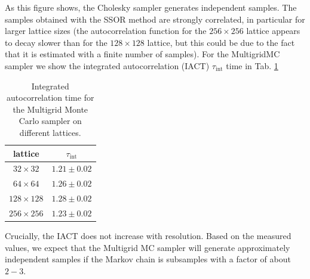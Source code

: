 \documentclass[11pt]{article}
\begin{document}
As this figure shows, the Cholesky sampler generates independent samples. The samples obtained with the SSOR method are strongly correlated, in particular for larger lattice sizes (the autocorrelation function for the $256\times 256$ lattice appears to decay slower than for the $128\times 128$ lattice, but this could be due to the fact that it is estimated with a finite number of samples). For the MultigridMC sampler we show the integrated autocorrelation (IACT) $\tau_{\text{int}}$ time in Tab. \ref{tab:tau_int}
\begin{table}
    \begin{center}
        \begin{tabular}{cc}
            \hline
            lattice         & $\tau_{\text{int}}$ \\
            \hline\hline
            $32 \times 32$  & $1.21 \pm  0.02$    \\
            $64\times 64$   & $1.26 \pm 0.02$     \\
            $128\times 128$ & $1.28 \pm  0.02$    \\
            $256\times256$  & $1.23 \pm  0.02$    \\
            \hline
        \end{tabular}
        \caption{Integrated autocorrelation time for the Multigrid Monte Carlo sampler on different lattices.}
        \label{tab:tau_int}
    \end{center}
\end{table}
Crucially, the IACT does not increase with resolution. Based on the measured values, we expect that the Multigrid MC sampler will generate approximately independent samples if the Markov chain is subsamples with a factor of about $2-3$.
\end{document}
